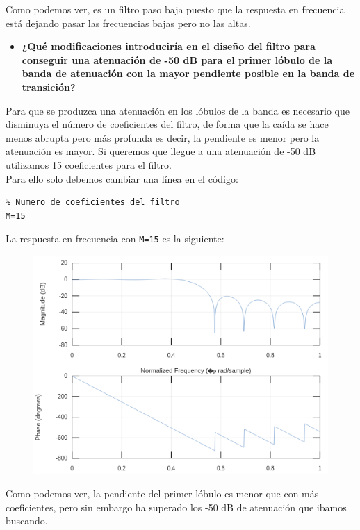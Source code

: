 \documentclass[11pt,a4paper]{article}
\begin{document}
Como podemos ver, es un filtro paso baja puesto que la respuesta en frecuencia está dejando pasar las frecuencias bajas pero no las altas.

\begin{itemize}
	\item \textbf{¿Qué modificaciones introduciría en el diseño del filtro para conseguir una atenuación de -50 dB para el primer lóbulo de la banda de atenuación con la mayor pendiente posible en la banda de transición?}
\end{itemize}

Para que se produzca una atenuación en los lóbulos de la banda es necesario que disminuya el número de coeficientes del filtro, de forma que la caída se hace menos abrupta pero más profunda es decir, la pendiente es menor pero la atenuación es mayor. Si queremos que llegue a una atenuación de -50 dB utilizamos 15 coeficientes para el filtro.\\

Para ello solo debemos cambiar una línea en el código:

\begin{lstlisting}[frame=single]
% Se definen los parametros
% Numero de coeficientes del filtro
M=15
\end{lstlisting}

La respuesta en frecuencia con \texttt{M=15} es la siguiente:

\begin{figure}[H]
	\centering
	\includegraphics[scale=0.5]{img/2.png}
\end{figure}

Como podemos ver, la pendiente del primer lóbulo es menor que con más coeficientes, pero sin embargo ha superado los -50 dB de atenuación que ibamos buscando.
\end{document}

